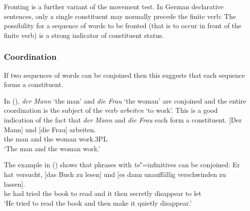 Fronting is a further variant of the movement test. In German declarative sentences, only a single constituent may normally precede the finite verb:
\eal
\label{bsp-v2}
\zl 
The possibility for a sequence of words to be fronted (that is to occur in front of the finite verb) is a strong indicator of constituent status.

\subsubsection{Coordination}

If two sequences of words can be conjoined then this suggests that each sequence
forms a constituent.

In (), \emph{der Mann} `the man' and \emph{die Frau} `the woman' are conjoined and the entire coordination
is the subject of the verb \emph{arbeiten} `to work'. This is a good indication of the fact that \emph{der Mann} and
\emph{die Frau} each form a constituent.
\ea
\gll {}[Der        Mann] und [die          Frau] arbeiten.\\
     \spacebr{}the man   and \spacebr{}the woman work.3PL\\
\glt `The man and the woman work.'
\z


The example in () shows that phrases with \emph{to}"=infinitives can be conjoined:
\ea
\gll Er hat versucht, [das Buch zu lesen] und [es dann unauffällig verschwinden zu lassen].\\
     he had tried \spacebr{}the book to read and \spacebr{}it then secretly disappear to let\\
\glt `He tried to read the book and then make it quietly disappear.'
\z
{}

